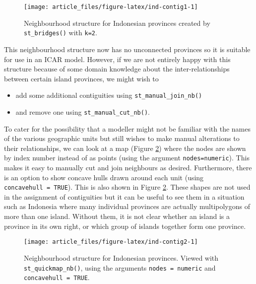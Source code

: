 \begin{figure}

{\centering \texttt{[image: article\_files/figure-latex/ind-contig1-1]} 

}

\caption{Neighbourhood structure for Indonesian provinces created by \texttt{st\_bridges()} with \texttt{k=2}.}\label{fig:ind-contig1}
\end{figure}

This neighbourhood structure now has no unconnected provinces so it is
suitable for use in an ICAR model. However, if we are not entirely happy with this structure because of some domain knowledge about the inter-relationships between certain island provinces, we might wish to

\begin{itemize}
\item
  add some additional contiguities using \texttt{st\_manual\_join\_nb()}
\item
  and remove one using \texttt{st\_manual\_cut\_nb()}.
\end{itemize}

To cater for the possibility that a modeller might not be familiar with the names of the various geographic units but still wishes to make manual alterations to their relationships, we can look at a map (Figure \ref{fig:ind-contig2}) where the nodes are shown by
index number instead of as points (using the argument \texttt{nodes=\textquotesingle{}numeric\textquotesingle{}}). This makes it easy to manually cut
and join neighbours as desired. Furthermore, there is an option to
show concave hulls drawn around each unit (using \texttt{concavehull\ =\ TRUE}). This is also shown in Figure \ref{fig:ind-contig2}. These shapes are not used in the assignment of contiguities but it can be useful to see them in a situation such as Indonesia where many individual provinces are actually multipolygons of more than one island. Without them, it is not clear whether an island is a province in its own right, or which group of islands together form one province.



\begin{figure}

{\centering \texttt{[image: article\_files/figure-latex/ind-contig2-1]} 

}

\caption{Neighbourhood structure for Indonesian provinces. Viewed with \texttt{st\_quickmap\_nb()}, using the arguments \texttt{nodes\ =\ \textquotesingle{}numeric\textquotesingle{}} and \texttt{concavehull\ =\ TRUE}.}\label{fig:ind-contig2}
\end{figure}


